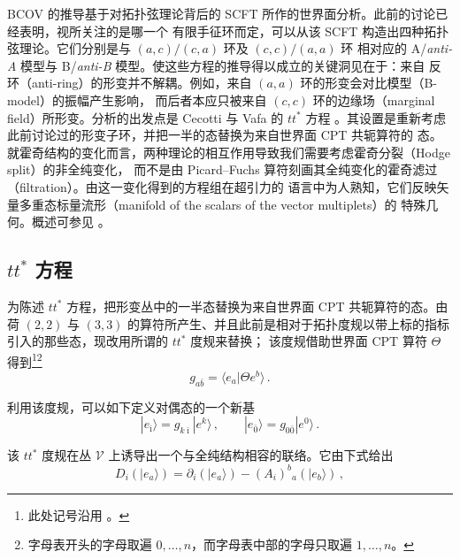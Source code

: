 BCOV 的推导基于对拓扑弦理论背后的 SCFT 所作的世界面分析。此前的讨论已经表明，视所关注的是哪一个
有限手征环而定，可以从该 SCFT 构造出四种拓扑弦理论。它们分别是与 $(a,c)/(c,a)$ 环及 $(c,c)/(a,a)$ 环
相对应的 A/\emph{anti-A} 模型与 B/\emph{anti-B} 模型。使这些方程的推导得以成立的关键洞见在于：来自
反环（anti-ring）的形变并不解耦。例如，来自 $(a,a)$ 环的形变会对比模型（B-model）的振幅产生影响，
而后者本应只被来自 $(c,c)$ 环的边缘场（marginal field）所形变。分析的出发点是 Cecotti 与 Vafa 的
$tt^*$ 方程 \cite{ref70}。其设置是重新考虑此前讨论过的形变子环，并把一半的态替换为来自世界面 CPT 共轭算符的
态。就霍奇结构的变化而言，两种理论的相互作用导致我们需要考虑霍奇分裂（Hodge split）的非全纯变化，
而不是由 Picard--Fuchs 算符刻画其全纯变化的霍奇滤过（filtration）。由这一变化得到的方程组在超引力的
语言中为人熟知，它们反映矢量多重态标量流形（manifold of the scalars of the vector multiplets）的
特殊几何。概述可参见 \cite{ref51,ref71}。

\subsection{\texorpdfstring{$tt^*$}{tt*} 方程}
\label{sec:4.1}

为陈述 $tt^*$ 方程，把形变丛中的一半态替换为来自世界面 CPT 共轭算符的态。由荷 $(2,2)$ 与 $(3,3)$
的算符所产生、并且此前是相对于拓扑度规以带上标的指标引入的那些态，现改用所谓的 $tt^*$ 度规来替换；
该度规借助世界面 CPT 算符 $\Theta$ 得到\footnote{此处记号沿用 \cite{ref34}。}\footnote{字母表开头的字母取遍
$0,\ldots,n$，而字母表中部的字母只取遍 $1,\ldots,n$。}
\begin{equation}
  g_{a\bar b}=\langle e_a|\Theta e^b\rangle\,.
  \tag{4.1}
  \label{eq:4.1}
\end{equation}

利用该度规，可以如下定义对偶态的一个新基
\begin{equation}
  |e_{\bar\imath}\rangle=g_{k\bar\imath}|e^k\rangle\,,\qquad
  |e_{\bar 0}\rangle=g_{0\bar 0}|e^0\rangle\,.
  \tag{4.2}
  \label{eq:4.2}
\end{equation}

该 $tt^*$ 度规在丛 $\mathcal{V}$ 上诱导出一个与全纯结构相容的联络。它由下式给出
\begin{equation}
  D_i(|e_a\rangle)=\partial_i(|e_a\rangle)-(A_i)^b{}_a(|e_b\rangle)\,,
  \tag{4.3}
  \label{eq:4.3}
\end{equation}


